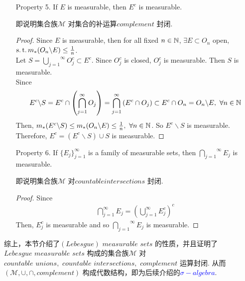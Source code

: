 \begin{enumerate}
		\newpage
		\item[Property 5.]If $E$ is measurable, then $E^c$ is measurable.
		\begin{rmk}
			即说明集合族$\mathcal{M}$ 对集合的补运算$complement$ 封闭.
		\end{rmk}
		\begin{proof}
			Since $E$ is measurable, then for all fixed $n \in \mathbb{N}$, $\exists E \subset O_n$ open, $\operatorname{s.t.} m_{*}(O_n \backslash E) \leq \frac{1}{n}$.\\
			Let $S = \overset{\infty}{\underset{j = 1}{\bigcup}}{O_{j}^c} \subset E^c$. Since $O_{j}^c$ is closed, $O_{j}^c$ is measurable. Then $S$ is measurable.\\
			Since
			\begin{align}
				E^c \backslash S = E^c \cap \left( \bigcap_{j = 1}^{\infty}{O_j} \right) = \bigcap_{j = 1}^{\infty}{\left( E^c \cap O_j \right)} \subset E^c \cap O_n = O_n \backslash E , \,\, \forall n \in \mathbb{N}
			\end{align}
			Then, $m_{*}(E^c \backslash S) \leq m_{*}(O_n \backslash E) \leq \frac{1}{n} , \,\, \forall n \in \mathbb{N}$. So $E^c \backslash S$ is measurable.\\
			Therefore, $E^c = \left( E^c \backslash S \right) \cup S$ is measurable.
		\end{proof}
	
		\vspace{2em}
		\item[Property 6.]If $\{ E_j \}_{j = 1}^{\infty}$ is a family of measurable sets, then $\overset{\infty}{\underset{j = 1}{\bigcap}}{E_j}$ is measurable.
		
		\begin{rmk}
			即说明集合族$\mathcal{M}$ 对$countable intersections$ 封闭.
		\end{rmk}
		
		\begin{proof}
			Since
			\begin{align}
				\bigcap_{j = 1}^{\infty}{E_j} = \left( \bigcup_{j = 1}^{\infty}{E_{j}^c} \right)^c
			\end{align}
			Then, $E_{j}^c$ is measurable and so $\overset{\infty}{\underset{j = 1}{\bigcap}}{E_j}$ is measurable.
		\end{proof}
	\end{enumerate}
	
	\vspace{2em}
	综上，本节介绍了$(Lebesgue) \,\, measurable \,\, sets$ 的性质，并且证明了$Lebesgue \,\, measurable \,\, sets$ 构成的集合族$\mathcal{M}$ 对$countable \,\, unions , \,\, countable \,\, intersections , \,\, complement$ 运算封闭. 从而$(\mathcal{M} , \cup , \cap , complement)$ 构成代数结构，即为后续介绍的\textcolor{blue}{$\sigma-algebra$}.
	
